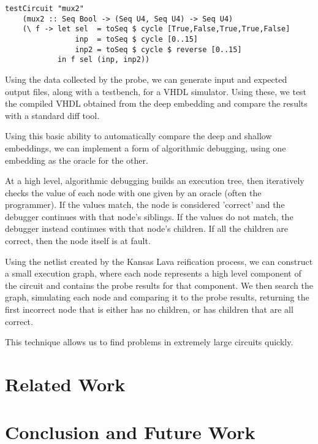 \documentclass{llncs}
\begin{document}
\begin{verbatim}
testCircuit "mux2" 
    (mux2 :: Seq Bool -> (Seq U4, Seq U4) -> Seq U4)
    (\ f -> let sel  = toSeq $ cycle [True,False,True,True,False]
                inp  = toSeq $ cycle [0..15]
                inp2 = toSeq $ cycle $ reverse [0..15]
            in f sel (inp, inp2))  
\end{verbatim}

Using the data collected by the probe, we can generate input and expected output
files, along with a testbench, for a VHDL simulator. Using these, we test the
compiled VHDL obtained from the deep embedding and compare the results with 
a standard diff tool.

Using this basic ability to automatically compare the deep and shallow embeddings,
we can implement a form of algorithmic debugging, using one embedding as the
oracle for the other.

At a high level, algorithmic debugging builds an execution tree, then iteratively
checks the value of each node with one given by an oracle (often the programmer).
If the values match, the node is considered 'correct' and the debugger continues
with that node's siblings. If the values do not match, the debugger instead continues
with that node's children. If all the children are correct, then the node itself is
at fault.


Using the netlist created by the Kansas Lava reification process, we can construct
a small execution graph, where each node represents a high level component of
the circuit and contains the probe results for that component. We then search the
graph, simulating each node and comparing it to the probe results, returning
the first incorrect node that is either has no children, or has children that
are all correct.


This technique allows us to find problems in extremely large circuits quickly.

\section{Related Work}

\section{Conclusion and Future Work}
\end{document}

